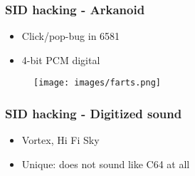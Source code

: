 
\begin{frame}
\frametitle{SID hacking - Arkanoid}

\begin{itemize}
\item Click/pop-bug in 6581
\item 4-bit PCM digital
\end{itemize}

\begin{figure}
\texttt{[image: images/farts.png]}
\end{figure}

\end{frame}


\begin{frame}
\frametitle{SID hacking - Digitized sound}

\begin{itemize}
\item Vortex, Hi Fi Sky
\item Unique: does not sound like C64 at all
\end{itemize}

\end{frame}
